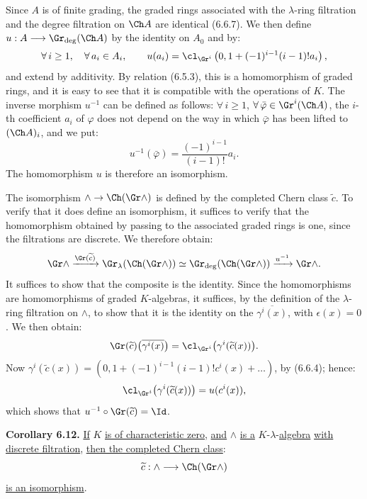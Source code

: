 %
Since \(A\) is of finite grading, the graded rings associated with the \(\lambda\)-ring filtration and the degree filtration on \(\Ch A\) are identical (6.6.7). We then define \(u:A\longrightarrow \Gr_{\deg}(\Ch A)\) by the identity on \(A_0\) and by:
\[
  \forall\, i\ge1,\quad\forall\, a_i\in A_i,\qquad u(a_i)=\cl_{\Gr^i}\left(0,1+(-1)^{i-1}(i-1)!a_i\right),
\]
and extend by additivity. By relation (6.5.3), this is a homomorphism of graded rings, and it is easy to see that it is compatible with the operations of \(K\). The inverse morphism \(u^{-1}\) can be defined as follows: \(\forall\, i\ge1\), \(\forall\,\bar\varphi\in\Gr^i(\Ch A)\), the \(i\)-th coefficient \(a_i\) of \(\varphi\) does not depend on the way in which \(\bar\varphi\) has been lifted to \((\Ch A)_i\), and we put:
\[
  u^{-1}(\bar\varphi)=\frac{(-1)^{i-1}}{(i-1)!}a_i.
\]
The homomorphism \(u\) is therefore an isomorphism.

The isomorphism \(\mathord{\wedge}\to\Ch(\Gr\mathord{\wedge})\) is defined by the completed Chern class \(\widetilde c\). To verify that it does define an isomorphism, it suffices to verify that the homomorphism obtained by passing to the associated graded rings is one, since the filtrations are discrete. We therefore obtain:
\[
  \Gr\mathord{\wedge}
   \xrightarrow{\Gr(\widetilde c)}
  \Gr_{\lambda}(\Ch(\Gr\mathord{\wedge}))
   \simeq
  \Gr_{\deg}(\Ch(\Gr\mathord{\wedge}))
   \xrightarrow{u^{-1}}
  \Gr\mathord{\wedge} .
\]
It suffices to show that the composite is the identity. Since the homomorphisms are homomorphisms of graded \(K\)-algebras, it suffices, by the definition of the \(\lambda\)-ring filtration on \(\mathord{\wedge}\), to show that it is the identity on the \(\overline{\gamma^i(x)}\), with \(\epsilon(x)=0\). We then obtain:
\[
  \Gr(\widetilde c)\bigl(\overline{\gamma^i(x)}\bigr)
  =
  \cl_{\Gr^i}\bigl(\gamma^i(\widetilde c(x))\bigr).
\]
Now \(\gamma^i(\widetilde c(x))=(0,1+(-1)^{i-1}(i-1)!c^i(x)+\ldots)\), by (6.6.4); hence:
\[
  \cl_{\Gr^i}\bigl(\gamma^i(\widetilde c(x))\bigr)=u(c^i(x)),
\]
%
which shows that \(u^{-1}\circ\Gr(\widetilde c)=\Id\).

\textbf{Corollary 6.12.} \uline{If} \(K\) \uline{is of characteristic zero}, \uline{and} \(\mathord{\wedge}\) \uline{is a} \(K\)-\(\lambda\)-\uline{algebra} \uline{with discrete filtration}, \uline{then the completed Chern class}:
\[
  \widetilde c:\mathord{\wedge}\longrightarrow \Ch(\Gr\mathord{\wedge})
\]
\uline{is an isomorphism}.

